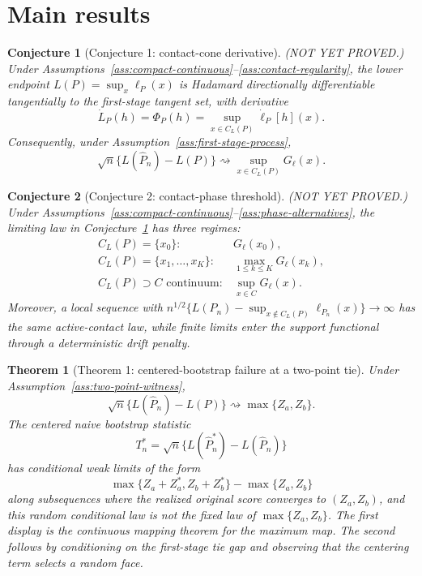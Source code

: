 \documentclass[11pt]{article}
\theoremstyle{definition}
\theoremstyle{plain}
\newtheorem{theorem}{Theorem}
\newtheorem{conjecture}{Conjecture}
\theoremstyle{remark}
\begin{document}
\section{Main results}
\begin{conjecture}[Conjecture 1: contact-cone derivative]\label{conj:contact-cone}
(NOT YET PROVED.)  Under Assumptions~\ref{ass:compact-continuous}--\ref{ass:contact-regularity}, the lower endpoint \(L(P)=\sup_x\ell_P(x)\) is Hadamard directionally differentiable tangentially to the first-stage tangent set, with derivative
\[
  \dot L_P(h)=\Phi_P(h)=\sup_{x\in C_L(P)}\dot\ell_P[h](x).
\]
Consequently, under Assumption~\ref{ass:first-stage-process},
\[
  \sqrt n\{L(\widehat P_n)-L(P)\}\rightsquigarrow
  \sup_{x\in C_L(P)}G_\ell(x).
\]
\end{conjecture}

\begin{conjecture}[Conjecture 2: contact-phase threshold]\label{conj:phase-threshold}
(NOT YET PROVED.)  Under Assumptions~\ref{ass:compact-continuous}--\ref{ass:phase-alternatives}, the limiting law in Conjecture~\ref{conj:contact-cone} has three regimes:
\[
  \begin{array}{ll}
  C_L(P)=\{x_0\}: & G_\ell(x_0),\\[2mm]
  C_L(P)=\{x_1,\ldots,x_K\}: & \max_{1\le k\le K}G_\ell(x_k),\\[2mm]
  C_L(P)\supset C\text{ continuum}: & \sup_{x\in C}G_\ell(x).
  \end{array}
\]
Moreover, a local sequence with \(n^{1/2}\{L(P_n)-\sup_{x\notin C_L(P)}\ell_{P_n}(x)\}\to\infty\) has the same active-contact law, while finite limits enter the support functional through a deterministic drift penalty.
\end{conjecture}

\begin{theorem}[Theorem 1: centered-bootstrap failure at a two-point tie]\label{thm:bootstrap-failure}
Under Assumption~\ref{ass:two-point-witness},
\[
  \sqrt n\{L(\widehat P_n)-L(P)\}\rightsquigarrow \max\{Z_a,Z_b\}.
\]
The centered naive bootstrap statistic
\[
  T_n^*=\sqrt n\{L(\widehat P_n^*)-L(\widehat P_n)\}
\]
has conditional weak limits of the form
\[
  \max\{Z_a+Z_a^*,Z_b+Z_b^*\}-\max\{Z_a,Z_b\}
\]
along subsequences where the realized original score converges to \((Z_a,Z_b)\), and this random conditional law is not the fixed law of \(\max\{Z_a,Z_b\}\).
The first display is the continuous mapping theorem for the maximum map.  The second follows by conditioning on the first-stage tie gap and observing that the centering term selects a random face.
\end{theorem}
\end{document}
